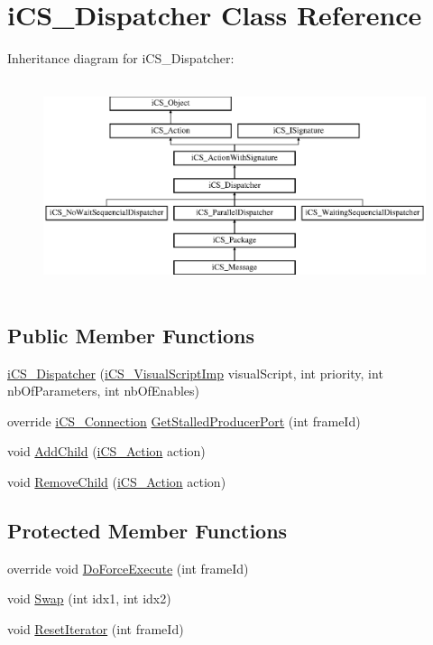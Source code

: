 \hypertarget{classi_c_s___dispatcher}{\section{i\+C\+S\+\_\+\+Dispatcher Class Reference}
\label{classi_c_s___dispatcher}
}
Inheritance diagram for i\+C\+S\+\_\+\+Dispatcher\+:\begin{figure}[H]
\begin{center}
\leavevmode
\includegraphics[height=6.192733cm]{classi_c_s___dispatcher}
\end{center}
\end{figure}
\subsection*{Public Member Functions}
\begin{DoxyCompactItemize}
\item 
\hyperlink{classi_c_s___dispatcher_a39d8f853fc1fee0b32b15056877f7baa}{i\+C\+S\+\_\+\+Dispatcher} (\hyperlink{classi_c_s___visual_script_imp}{i\+C\+S\+\_\+\+Visual\+Script\+Imp} visual\+Script, int priority, int nb\+Of\+Parameters, int nb\+Of\+Enables)
\item 
override \hyperlink{classi_c_s___connection}{i\+C\+S\+\_\+\+Connection} \hyperlink{classi_c_s___dispatcher_a070ce5ef137d397b68a844b3ec85d3f4}{Get\+Stalled\+Producer\+Port} (int frame\+Id)
\item 
void \hyperlink{classi_c_s___dispatcher_a2778126b697d7474e914dcdf4fd69883}{Add\+Child} (\hyperlink{classi_c_s___action}{i\+C\+S\+\_\+\+Action} action)
\item 
void \hyperlink{classi_c_s___dispatcher_a938b98e914afeb9f7eeaa9b46a49501e}{Remove\+Child} (\hyperlink{classi_c_s___action}{i\+C\+S\+\_\+\+Action} action)
\end{DoxyCompactItemize}
\subsection*{Protected Member Functions}
\begin{DoxyCompactItemize}
\item 
override void \hyperlink{classi_c_s___dispatcher_a940bea22c8cb7f6120d99ce61b8e3313}{Do\+Force\+Execute} (int frame\+Id)
\item 
void \hyperlink{classi_c_s___dispatcher_a933ac7f3cce4eb5a79a10ba28de8a656}{Swap} (int idx1, int idx2)
\item 
void \hyperlink{classi_c_s___dispatcher_a1732014516a21067c38985479a74ae0b}{Reset\+Iterator} (int frame\+Id)
\end{DoxyCompactItemize}
